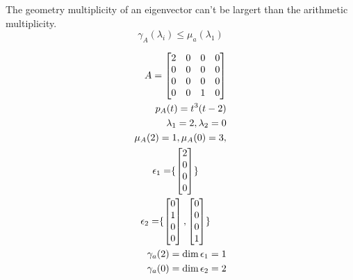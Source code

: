 The geometry multiplicity of an eigenvector can't be largert than the arithmetic multiplicity.
\begin{equation}
    \gamma_A(\lambda_i) \leq \mu_a(\lambda_1)
\end{equation}
\begin{example}
    \begin{align*}
        A = \begin{bmatrix}
            2 & 0 & 0 & 0 \\ 0 & 0 & 0 &0 \\ 0 & 0 &0 &0 \\ 0 & 0 & 1 & 0
        \end{bmatrix}                                                  \\
        p_A(t) = t^3(t- 2)                                                               \\
        \lambda_1 = 2, \lambda_2 = 0                                                     \\
        \mu_A(2) = 1, \mu_A(0) = 3,                                                      \\
        \epsilon_1 = \span \{ \begin{bmatrix}
            2 \\ 0 \\ 0 \\ 0
        \end{bmatrix} \}                             \\
        \epsilon_2 = \span \{ \begin{bmatrix}
            0 \\ 1 \\ 0 \\ 0
        \end{bmatrix}, \begin{bmatrix}
            0 \\ 0 \\ 0 \\ 1
        \end{bmatrix}\} \\
        \gamma_a(2) = \dim \epsilon_1 = 1                                                \\
        \gamma_a(0) = \dim \epsilon_2 = 2
    \end{align*}
\end{example}
